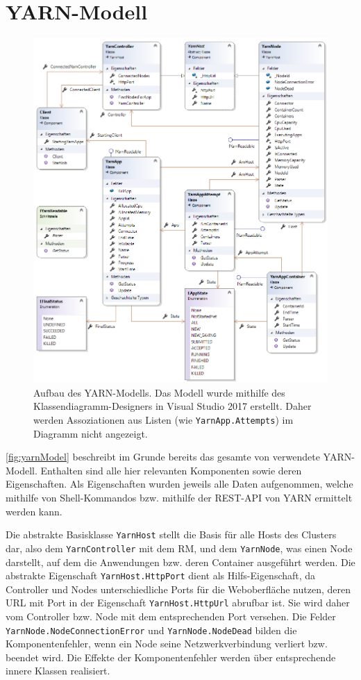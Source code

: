\section{YARN-Modell}\label{sec:yarnModel}

\begin{figure}
	\centering
	\includegraphics[width=.8\columnwidth]{./images/yarnModel.png}
	\caption[Aufbau des YARN-Modells]{Aufbau des YARN-Modells. Das Modell wurde mithilfe des Klassendiagramm-Designers in Visual Studio 2017 erstellt. Daher werden Assoziationen aus Listen (wie \texttt{YarnApp.Attempts}) im Diagramm nicht angezeigt.}
	\label{fig:yarnModel}
\end{figure}

\autoref{fig:yarnModel} beschreibt im Grunde bereits das gesamte von \sS verwendete YARN-Modell. Enthalten sind alle hier relevanten Komponenten sowie deren Eigenschaften. Als Eigenschaften wurden jeweils alle Daten aufgenommen, welche mithilfe von Shell-Kommandos bzw. mithilfe der REST-API von YARN ermittelt werden kann.

Die abstrakte Basisklasse \texttt{YarnHost} stellt die Basis für alle Hosts des Clusters dar, also dem \texttt{YarnController} mit dem \ac{RM}, und dem \texttt{YarnNode}, was einen Node darstellt, auf dem die Anwendungen bzw. deren Container ausgeführt werden. Die abstrakte Eigenschaft \texttt{YarnHost.HttpPort} dient als Hilfs-Eigenschaft, da Controller und Nodes unterschiedliche Ports für die Weboberfläche nutzen, deren URL mit Port in der Eigenschaft \texttt{YarnHost.HttpUrl} abrufbar ist. Sie wird daher vom Controller bzw. Node mit dem entsprechenden Port versehen. Die Felder \texttt{YarnNode.NodeConnectionError} und \texttt{YarnNode.NodeDead} bilden die Komponentenfehler, wenn ein Node seine Netzwerkverbindung verliert bzw. beendet wird. Die Effekte der Komponentenfehler werden über entsprechende innere Klassen realisiert.

